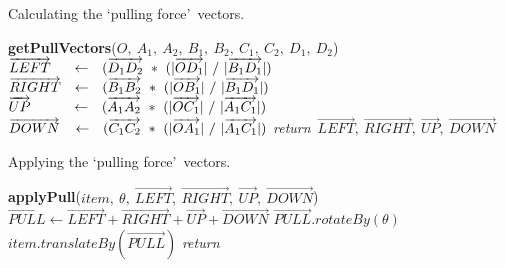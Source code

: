 \documentclass{bmcart}
\newcommand{\INDSTATE}[1][1]{\STATE\hspace{#1\algorithmicindent}}
\begin{document}
\begin{backmatter}
\begin{algorithm}[h!]
\caption{Calculating the \lq pulling force\rq~vectors.}
\label{algo:pullLayoutOne}
\begin{algorithmic}
\STATE \textbf{getPullVectors}($O,\ A_{1},\ A_{2},\ B_{1},\ B_{2},\ C_{1},\ C_{2},\ D_{1},\ D_{2}$)
\INDSTATE[2]$\overrightarrow{LEFT}\hspace{0.5cm} \leftarrow \hspace{0.25cm}(\overrightarrow{D_{1}D_{2}}\ *\ ( |\overrightarrow{OD_{1}}|\  /\ |\overrightarrow{B_{1}D_{1}}| )$
\INDSTATE[2]$\overrightarrow{RIGHT}\hspace{0.25cm} \leftarrow \hspace{0.25cm}(\overrightarrow{B_{1}B_{2}}\ *\ ( |\overrightarrow{OB_{1}}|\  /\ |\overrightarrow{B_{1}D_{1}}| )$
\INDSTATE[2]$\overrightarrow{UP}\hspace{1cm} \leftarrow \hspace{0.25cm}(\overrightarrow{A_{1}A_{2}}\ *\ ( |\overrightarrow{OC_{1}}|\  /\ |\overrightarrow{A_{1}C_{1}}| )$
\INDSTATE[2]$\overrightarrow{DOWN}\hspace{0.3cm} \leftarrow \hspace{0.25cm}(\overrightarrow{C_{1}C_{2}}\ *\ ( |\overrightarrow{OA_{1}}|\  /\ |\overrightarrow{A_{1}C_{1}}| )$
\STATE \textit{return}\ $\overrightarrow{LEFT},\ \overrightarrow{RIGHT},\ \overrightarrow{UP},\ \overrightarrow{DOWN}$
\end{algorithmic}
\end{algorithm}

\begin{algorithm}[h!]
\caption{Applying the \lq pulling force\rq~vectors.}
\label{algo:pullLayoutTwo}
\begin{algorithmic}
\STATE \textbf{applyPull}($item,\ \theta,\ \overrightarrow{LEFT},\ \overrightarrow{RIGHT},\ \overrightarrow{UP},\ \overrightarrow{DOWN}$)
\INDSTATE[2]$\overrightarrow{PULL} \leftarrow \overrightarrow{LEFT} + \overrightarrow{RIGHT} + \overrightarrow{UP} + \overrightarrow{DOWN}$
\INDSTATE[2]$\overrightarrow{PULL}.rotateBy(\theta)$
\INDSTATE[2]$item.translateBy(\overrightarrow{PULL})$
\STATE \textit{return}
\end{algorithmic}
\end{algorithm}



\end{backmatter}
\end{document}
